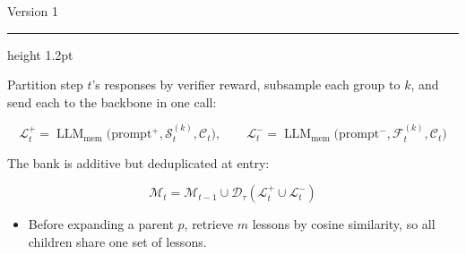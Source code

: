 \documentclass[aspectratio=169]{beamer}
\newcommand{\titlerule}{{\color{titledred}\hrule height 1.2pt}}
\begin{document}
\begin{frame}{Version 1}
\vspace{0.1em}
\titlerule
\vspace{1.4em}

Partition step $t$'s responses by verifier reward, subsample each group to $k$,
and send each to the backbone in one call:

\vspace{0.3em}
{\footnotesize
\begin{equation*}
\mathcal{L}_t^{+}=\operatorname{LLM}_{\mathrm{mem}}\bigl(\mathrm{prompt}^{+},\mathcal{S}_t^{(k)},\mathcal{C}_t\bigr),
\qquad
\mathcal{L}_t^{-}=\operatorname{LLM}_{\mathrm{mem}}\bigl(\mathrm{prompt}^{-},\mathcal{F}_t^{(k)},\mathcal{C}_t\bigr)
\end{equation*}
}

\vspace{1.2em}
The bank is additive but deduplicated at entry:

\vspace{0.3em}
{\footnotesize
\begin{equation*}
\mathcal{M}_t=\mathcal{M}_{t-1}\cup\mathcal{D}_\tau\!\left(\mathcal{L}_t^{+}\cup\mathcal{L}_t^{-}\right)
\end{equation*}
}

\vspace{1.2em}
\begin{itemize}
  \item Before expanding a parent $p$, retrieve $m$ lessons by cosine similarity, so all children share one set of lessons.

\end{itemize}
\end{frame}
\end{document}
